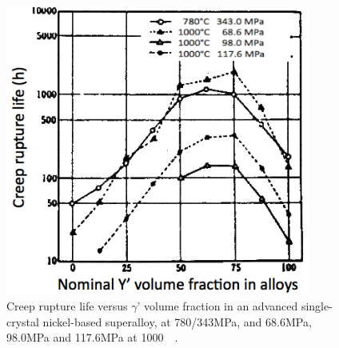 \begin{figure}[H]
\begin{center}
\includegraphics[width=10cm]{gpvolfrac}
\caption{Creep rupture life versus $\gamma$' volume fraction in an advanced single-crystal nickel-based superalloy, at 780\celsius/343MPa, and 68.6MPa, 98.0MPa and 117.6MPa at 1000\celsius\ ~\cite{harada82}.}
\label{fig:gpvolfrac}
\end{center}
\end{figure}
%

